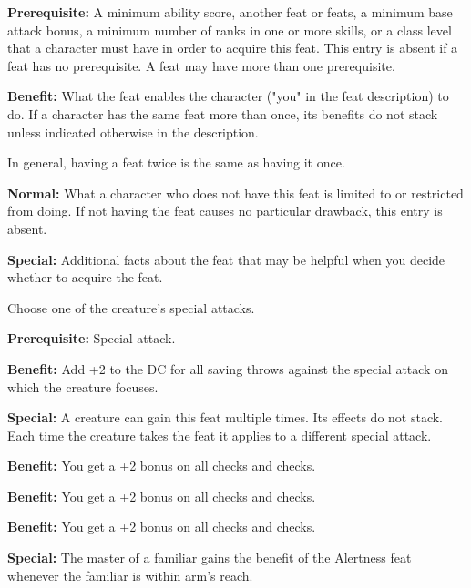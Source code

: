\textbf{Prerequisite:} A minimum ability score, another feat or feats, a minimum 
base attack bonus, a minimum number of ranks in one or more skills, or a class 
level that a character must have in order to acquire this feat. This entry is absent 
if a feat has no prerequisite. A feat may have more than one prerequisite.

\textbf{Benefit:} What the feat enables the character ("you" in the feat description) 
to do. If a character has the same feat more than once, its benefits do not stack 
unless indicated otherwise in the description.

In general, having a feat twice is the same as having it once.

\textbf{Normal:} What a character who does not have this feat is limited to or 
restricted from doing. If not having the feat causes no particular drawback, this 
entry is absent.

\textbf{Special:} Additional facts about the feat that may be helpful when you 
decide whether to acquire the feat.



Choose one of the creature's special attacks.

\textbf{Prerequisite:} Special attack.

\textbf{Benefit:} Add +2 to the DC for all saving throws against the special attack 
on which the creature focuses.

\textbf{Special:} A creature can gain this feat multiple times. Its effects do 
not stack. Each time the creature takes the feat it applies to a different special 
attack.


\textbf{Benefit:} You get a +2 bonus on all  checks and  checks.


\textbf{Benefit:} You get a +2 bonus on all  checks and  checks.


\textbf{Benefit:} You get a +2 bonus on all  checks and  checks.

\textbf{Special:} The master of a familiar gains the benefit of the Alertness feat 
whenever the familiar is within arm's reach.


